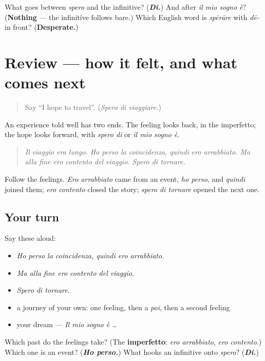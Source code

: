 \begin{tcolorbox}[breakable,colback=teal!4,colframe=teal!35!black,title={Before you move on}]
What goes between \emph{spero} and the infinitive? (\emph{\textbf{Di.}}) And after \emph{il mio sogno è}? (\textbf{Nothing} — the infinitive follows bare.) Which English word is \emph{spērāre} with \emph{dē-} in front? (\textbf{Desperate.})
\end{tcolorbox}
\section[(review)]{Review — how it felt, and what comes next}

\label{lesson:IT-C269-ripasso-sentimenti}



\begin{quote}
Say \textquotedblleft{}I hope to travel\textquotedblright{}. (\emph{Spero di viaggiare.})
\end{quote}

\begin{grammarlens}[title={What you've built}]
An experience told well has two ends. The feeling looks back, in the imperfetto; the hope looks forward, with \emph{spero di} or \emph{il mio sogno è}.

\begin{quote}
\emph{Il viaggio era lungo. Ho perso la coincidenza, quindi ero arrabbiato. Ma alla fine ero contento del viaggio. Spero di tornare.}
\end{quote}

Follow the feelings. \emph{Ero arrabbiato} came from an event, \emph{ho perso}, and \emph{quindi} joined them; \emph{ero contento} closed the story; \emph{spero di tornare} opened the next one.
\end{grammarlens}

\subsection*{Your turn}
Say these aloud:

\begin{itemize}
\raggedright
  \item \emph{Ho perso la coincidenza, quindi ero arrabbiato.}
  \item \emph{Ma alla fine ero contento del viaggio.}
  \item \emph{Spero di tornare.}
  \item a journey of your own: one feeling, then a \emph{poi}, then a second feeling
  \item your dream — \emph{Il mio sogno è …}
\end{itemize}

\begin{tcolorbox}[breakable,colback=teal!4,colframe=teal!35!black,title={Before you move on}]
Which past do the feelings take? (The \textbf{imperfetto}: \emph{ero arrabbiato}, \emph{ero contento}.) Which one is an event? (\emph{\textbf{Ho perso.}}) What hooks an infinitive onto \emph{spero}? (\emph{\textbf{Di.}})
\end{tcolorbox}
